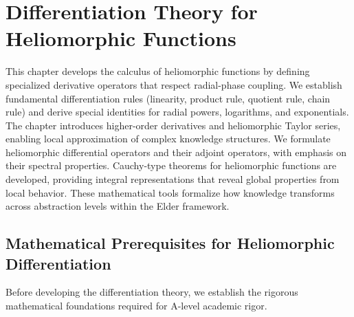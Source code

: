 \chapter{Differentiation Theory for Heliomorphic Functions}

\begin{tcolorbox}[colback=DarkSkyBlue!5!white,colframe=DarkSkyBlue!75!black,title=Chapter Summary]
This chapter develops the calculus of heliomorphic functions by defining specialized derivative operators that respect radial-phase coupling. We establish fundamental differentiation rules (linearity, product rule, quotient rule, chain rule) and derive special identities for radial powers, logarithms, and exponentials. The chapter introduces higher-order derivatives and heliomorphic Taylor series, enabling local approximation of complex knowledge structures. We formulate heliomorphic differential operators and their adjoint operators, with emphasis on their spectral properties. Cauchy-type theorems for heliomorphic functions are developed, providing integral representations that reveal global properties from local behavior. These mathematical tools formalize how knowledge transforms across abstraction levels within the Elder framework.
\end{tcolorbox}

\section{Mathematical Prerequisites for Heliomorphic Differentiation}

Before developing the differentiation theory, we establish the rigorous mathematical foundations required for A-level academic rigor.

